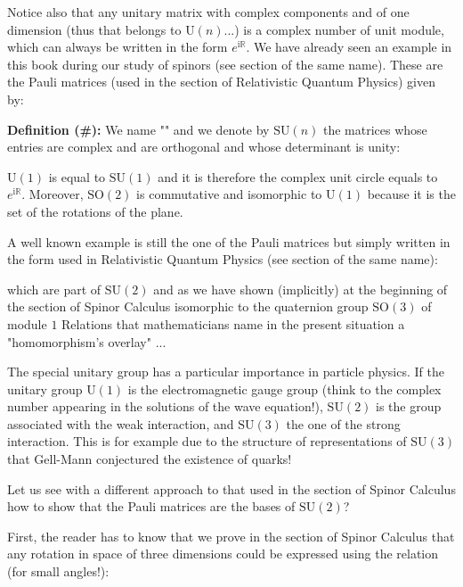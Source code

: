 	Notice also that any unitary matrix with complex components and of one dimension  (thus that belongs to $\text{U}(n)$...) is a complex number of unit module, which can always be written in the form $e^{\mathrm{i}\mathbb{R}}$.
	We have already seen an example in this book during our study of spinors (see section of the same name). These are the Pauli matrices (used in the section of Relativistic Quantum Physics) given by:
	
	\textbf{Definition (\#\mydef):} We name "" and we denote by $\text{SU} (n)$ the matrices whose entries are complex and are orthogonal and whose determinant is unity:
	
	\begin{tcolorbox}[title=Remark,colframe=black,arc=10pt]
	$\text{U}(1)$ is equal to $\text{SU}(1)$ and it is therefore the complex unit circle equals to $e^{\mathrm{i}\mathbb{R}}$. Moreover, $\text{SO} (2)$ is commutative and isomorphic to $\text{U}(1)$ because it is the set of the rotations of the plane.
	\end{tcolorbox}
	A well known example is still the one of the Pauli matrices but simply written in the form used in Relativistic Quantum Physics (see section of the same name):
	
	which are part of $\text{SU} (2)$ and as we have shown (implicitly) at the beginning of the section of Spinor Calculus isomorphic to the quaternion group $\text{SO} (3)$ of module $1$ Relations that mathematicians name in the present situation a "homomorphism's overlay" ...
	\begin{tcolorbox}[title=Remark,colframe=black,arc=10pt]
	The special unitary group has a particular importance in particle physics. If the unitary group $\text{U} (1)$ is the electromagnetic gauge group (think to the complex number appearing in the solutions of the wave equation!), $\text{SU} (2)$ is the group associated with the weak interaction, and $\text{SU} (3)$ the one of the strong interaction. This is for example due to the structure of representations of $\text{SU} (3)$ that Gell-Mann conjectured the existence of quarks!
	\end{tcolorbox}
	Let us see with a different approach to that used in the section of Spinor Calculus how to show that the Pauli matrices are the bases of $\text{SU} (2)$?
	
	First, the reader has to know that we prove in the section of Spinor Calculus  that any rotation in space of three dimensions could be expressed using the relation (for small angles!):
	
